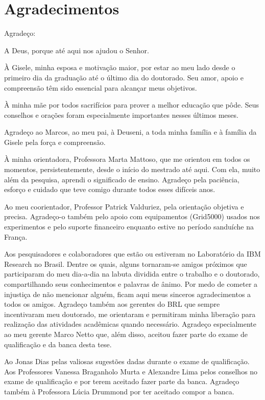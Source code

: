 \chapter*{Agradecimentos}

Agradeço:

A Deus, porque até aqui nos ajudou o Senhor. 

À Gisele, minha esposa e motivação maior, por estar ao meu lado desde o primeiro dia da graduação até o último dia do doutorado. Seu amor, apoio e compreensão têm sido essencial para alcançar meus objetivos.

À minha mãe por todos sacrifícios para prover a melhor educação que pôde. Seus conselhos e orações foram especialmente importantes nesses últimos meses. 

Agradeço ao Marcos, ao meu pai, à Deuseni, a toda minha família e à família da Gisele pela força e compreensão.

À minha orientadora, Professora Marta Mattoso, 
que me orientou em todos os momentos, persistentemente, desde o início do mestrado até aqui. Com ela, muito além da pesquisa, aprendi o significado de ensino. Agradeço pela paciência, esforço e cuidado que teve comigo durante todos esses difíceis anos. 

Ao meu coorientador, Professor Patrick Valduriez, pela orientação objetiva e precisa. Agradeço-o também pelo apoio com equipamentos (Grid5000) usados nos experimentos e pelo suporte financeiro enquanto estive no período sanduíche na França.

Aos pesquisadores e colaboradores que estão ou estiveram no Laboratório da IBM Research no Brasil. Dentre os quais, alguns tornaram-se amigos próximos que participaram do meu dia-a-dia na labuta dividida entre o trabalho e o doutorado, compartilhando seus conhecimentos e palavras de ânimo. Por medo de cometer a injustiça de não mencionar alguém, ficam aqui meus sinceros agradecimentos a todos os amigos. Agradeço também aos gerentes do BRL que sempre incentivaram meu doutorado, me orientaram e permitiram minha liberação para realização das atividades acadêmicas quando necessário. Agradeço especialmente ao meu gerente Marco Netto que, além disso, aceitou fazer parte do exame de qualificação e da banca desta tese.

Ao Jonas Dias pelas valiosas sugestões dadas durante o exame de qualificação. Aos Professores Vanessa Braganholo Murta e Alexandre Lima pelos conselhos no exame de qualificação e por terem aceitado fazer parte da banca. Agradeço também à Professora Lúcia Drummond por ter aceitado compor a banca.

